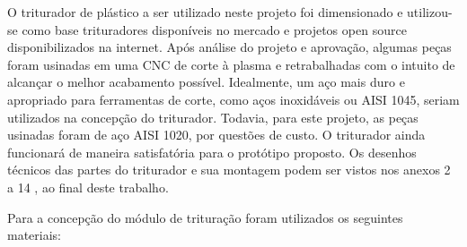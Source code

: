 O triturador de plástico a ser utilizado neste projeto foi dimensionado e utilizou-se como base trituradores disponíveis no mercado e projetos open source disponibilizados na internet. Após análise do projeto e aprovação, algumas peças foram usinadas em uma CNC de corte à plasma e retrabalhadas com o intuito de alcançar o melhor acabamento possível. Idealmente, um aço mais duro e apropriado para ferramentas de corte, como aços inoxidáveis ou AISI 1045, seriam utilizados na concepção do triturador. Todavia, para este projeto, as peças usinadas foram de aço AISI 1020, por questões de custo.  O triturador ainda funcionará de maneira satisfatória para o protótipo proposto. Os desenhos técnicos das partes do triturador e sua montagem podem ser vistos nos anexos 2 a 14 , ao final deste trabalho.

Para a concepção do módulo de trituração foram utilizados os seguintes materiais:

